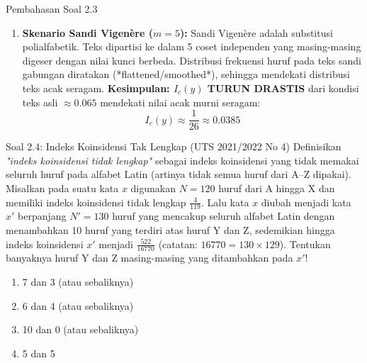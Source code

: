 \documentclass[11pt,a4paper]{article}
\begin{document}
\begin{solusibox}{Pembahasan Soal 2.3}
\begin{enumerate}[leftmargin=*]
\begin{enumerate}[label=(\roman*)]
        \textbf{Kesimpulan: $I_c(y)$ TETAP TAK BERUBAH ($I_c(y) = I_c(x) \approx 0.065$).}
        \item \textbf{Skenario Sandi Vigen\`ere ($m = 5$):}
        Sandi Vigen\`ere adalah substitusi polialfabetik. Teks dipartisi ke dalam 5 coset independen yang masing-masing digeser dengan nilai kunci berbeda. Distribusi frekuensi huruf pada teks sandi gabungan diratakan (*flattened/smoothed*), sehingga mendekati distribusi teks acak seragam.
        \textbf{Kesimpulan: $I_c(y)$ TURUN DRASTIS} dari kondisi teks asli $\approx 0.065$ mendekati nilai acak murni seragam:
        \[
        I_c(y) \approx \frac{1}{26} \approx \mathbf{0.0385}
        \]
    \end{enumerate}
\end{enumerate}
\end{solusibox}

\vspace{0.4cm}

\begin{soalbox}{Soal 2.4: Indeks Koinsidensi Tak Lengkap (UTS 2021/2022 No 4)}
Definisikan \textit{"indeks koinsidensi tidak lengkap"} sebagai indeks koinsidensi yang tidak memakai seluruh huruf pada alfabet Latin (artinya tidak semua huruf dari A--Z dipakai).
Misalkan pada suatu kata $x$ digunakan $N = 120$ huruf dari A hingga X dan memiliki indeks koinsidensi tidak lengkap $\frac{4}{119}$.
Lalu kata $x$ diubah menjadi kata $x'$ berpanjang $N' = 130$ huruf yang mencakup seluruh alfabet Latin dengan menambahkan 10 huruf yang terdiri atas huruf Y dan Z, sedemikian hingga indeks koinsidensi $x'$ menjadi $\frac{522}{16770}$ (catatan: $16770 = 130 \times 129$).
Tentukan banyaknya huruf Y dan Z masing-masing yang ditambahkan pada $x'$!
\begin{enumerate}[label=(\alph*)]
    \item 7 dan 3 (atau sebaliknya)
    \item 6 dan 4 (atau sebaliknya)
    \item 10 dan 0 (atau sebaliknya)
    \item 5 dan 5
\end{enumerate}
\end{soalbox}
\end{document}
